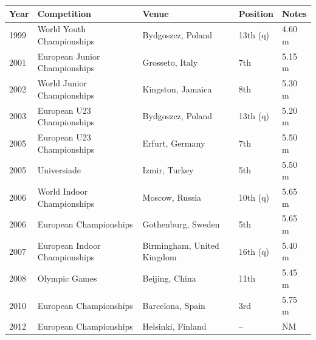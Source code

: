\documentclass{article}
\begin{document}
\begin{tabular}{lllll}
\toprule
Year & Competition & Venue & Position & Notes \\
\midrule
1999 & World Youth Championships & Bydgoszcz, Poland & 13th (q) & 4.60 m \\
2001 & European Junior Championships & Grosseto, Italy & 7th & 5.15 m \\
2002 & World Junior Championships & Kingston, Jamaica & 8th & 5.30 m \\
2003 & European U23 Championships & Bydgoszcz, Poland & 13th (q) & 5.20 m \\
2005 & European U23 Championships & Erfurt, Germany & 7th & 5.50 m \\
2005 & Universiade & Izmir, Turkey & 5th & 5.50 m \\
2006 & World Indoor Championships & Moscow, Russia & 10th (q) & 5.65 m \\
2006 & European Championships & Gothenburg, Sweden & 5th & 5.65 m \\
2007 & European Indoor Championships & Birmingham, United Kingdom & 16th (q) & 5.40 m \\
2008 & Olympic Games & Beijing, China & 11th & 5.45 m \\
2010 & European Championships & Barcelona, Spain & 3rd & 5.75 m \\
2012 & European Championships & Helsinki, Finland & – & NM \\
\bottomrule
\end{tabular}
\end{document}

